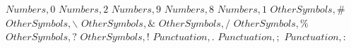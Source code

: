 \documentclass{article}
\begin{document}
$Numbers,0$
\linebreak
\linebreak
$Numbers,2$
\linebreak
\linebreak
$Numbers,9$
\linebreak
\linebreak
$Numbers,8$
\linebreak
\linebreak
$Numbers,1$
\linebreak
\linebreak
$Other Symbols,\#$
\linebreak
\linebreak
$Other Symbols,\backslash$
\linebreak
\linebreak
$Other Symbols,\&$
\linebreak
\linebreak
$Other Symbols,/$
\linebreak
\linebreak
$Other Symbols,\%$
\linebreak
\linebreak
$Other Symbols,?$
\linebreak
\linebreak
$Other Symbols,!$
\linebreak
\linebreak
$Punctuation,.$
\linebreak
\linebreak
$Punctuation,;$
\linebreak
\linebreak
$Punctuation,:$
\end{document}
